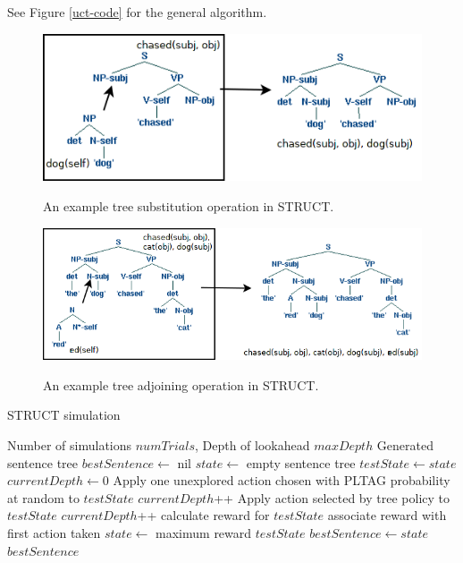 See
Figure \ref{uct-code} for the general algorithm.

\begin{figure}[t]
\centering
\includegraphics[width= 0.7 \linewidth]{sub-example.png}\label{examples-s}
\caption{An example tree substitution operation in STRUCT.}
\end{figure}

\begin{figure}[t]
\centering
\includegraphics[width= 0.7 \linewidth]{adjoin-example.png}\label{examples-a}
\caption{An example tree adjoining operation in STRUCT.}
\end{figure}

\begin{algorithm}
\caption{STRUCT simulation}\label{uct-code}
\begin{algorithmic}[1]
\REQUIRE Number of simulations $numTrials$, Depth of lookahead $maxDepth$
\ENSURE Generated sentence tree
\STATE $bestSentence \gets$ nil
\STATE $state \gets$ empty sentence tree
		\STATE $testState \gets state$
		\STATE $currentDepth \gets 0$
			\STATE Apply one unexplored action chosen
                        with PLTAG probability at random to $testState$
			\STATE $currentDepth$++
		\ENDIF
			\STATE Apply action selected by tree
                        policy to $testState$
			\STATE $currentDepth$++
		\ENDWHILE
		\STATE calculate reward for $testState$
		\STATE associate reward with first action taken
	\ENDFOR
	\STATE $state \gets$ maximum reward $testState$
		\STATE $bestSentence \gets state$
	\ENDIF
\ENDWHILE
\RETURN $bestSentence$
\end{algorithmic}
\end{algorithm}

